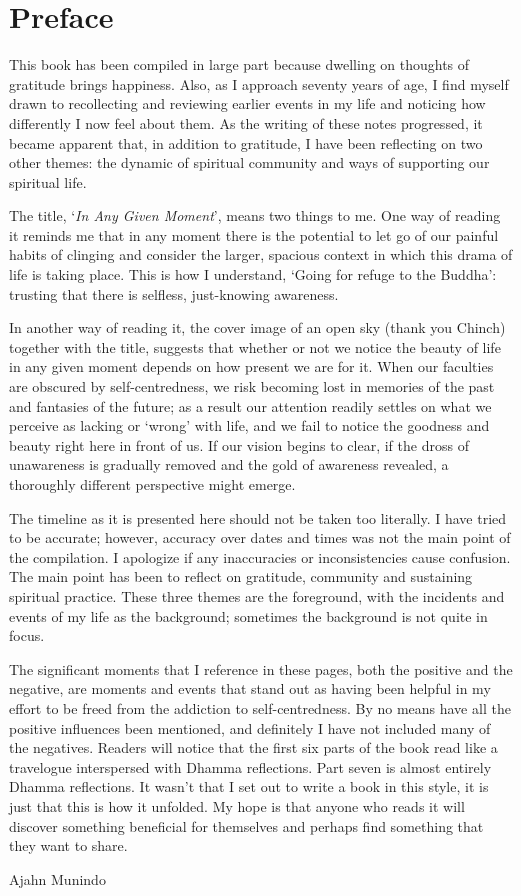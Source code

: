 \chapter{Preface}

This book has been compiled in large part because dwelling on thoughts
of gratitude brings happiness. Also, as I approach seventy years of age,
I find myself drawn to recollecting and reviewing earlier events in my
life and noticing how differently I now feel about them. As the writing
of these notes progressed, it became apparent that, in addition to
gratitude, I have been reflecting on two other themes: the dynamic of
spiritual community and ways of supporting our spiritual life.

The title, `\emph{In Any Given Moment}', means two things to me. One way
of reading it reminds me that in any moment there is the potential to
let go of our painful habits of clinging and consider the larger,
spacious context in which this drama of life is taking place. This is
how I understand, `Going for refuge to the Buddha': trusting that there
is selfless, just-knowing awareness.

In another way of reading it, the cover image of an open sky (thank you
Chinch) together with the title, suggests that whether or not we notice
the beauty of life in any given moment depends on how present we are for
it. When our faculties are obscured by self-centredness, we risk
becoming lost in memories of the past and fantasies of the future; as a
result our attention readily settles on what we perceive as lacking or
`wrong' with life, and we fail to notice the goodness and beauty right
here in front of us. If our vision begins to clear, if the dross of
unawareness is gradually removed and the gold of awareness revealed, a
thoroughly different perspective might emerge.

The timeline as it is presented here should not be taken too literally.
I have tried to be accurate; however, accuracy over dates and times was
not the main point of the compilation. I apologize if any inaccuracies
or inconsistencies cause confusion. The main point has been to reflect
on gratitude, community and sustaining spiritual practice. These three
themes are the foreground, with the incidents and events of my life as
the background; sometimes the background is not quite in focus.

The significant moments that I reference in these pages, both the
positive and the negative, are moments and events that stand out as
having been helpful in my effort to be freed from the addiction to
self-centredness. By no means have all the positive influences been
mentioned, and definitely I have not included many of the negatives.
Readers will notice that the first six parts of the book read like a
travelogue interspersed with Dhamma reflections. Part seven is almost
entirely Dhamma reflections. It wasn't that I set out to write a book in
this style, it is just that this is how it unfolded. My hope is that
anyone who reads it will discover something beneficial for themselves
and perhaps find something that they want to share.

\bigskip

{\raggedleft
  Ajahn Munindo
\par}

